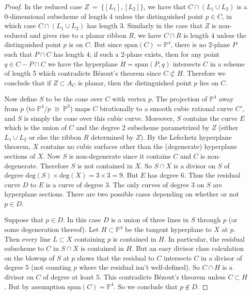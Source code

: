 \documentclass[twoside,12pt,reqno]{amsart}
\theoremstyle{plain}
\theoremstyle{definition}
\newcommand{\PP}{\mathbb{P}}
\def\ps{\vspace{4pt}}
\begin{document}
\begin{proof}
In the reduced case
$Z~=~\{[L_1],[L_2]\}$, we have that $C\cap(L_1\cup L_2)$ is a
0-dimensional subscheme of length 4 unless the distinguished point
$p\in C$, in which case $C\cap(L_1\cup L_2)$ has length 3.  Similarly
in the case that $Z$ is non-reduced and gives rise to a planar ribbon
$R$, we have $C\cap R$ is length 4 unless the distinguished point
$p$ is on $C$.  But since $\text{span}(C)=\PP^4$, there is no 2-plane $P$
such that $P\cap C$ has length 4; if such a 2-plane exists, then for
any point $q\in C-P\cap C$ we have the hyperplane $H=\text{span}(P,q)$ 
intersects $C$ in a scheme of length 5 which contradicts B\'ezout's
theorem since $C\not\subset H$.  Therefore we conclude that if
$Z\subset A_C$ is planar, then the distinguished point $p$ lies on
$C$.  

\ps

Now define $S$ to be the cone over $C$ with vertex $p$.  The
projection of $\PP^4$ away from $p$ (to $\PP^4/p~\cong~\PP^3$) maps
$C$ birationally to a smooth cubic rational curve $C'$, and $S$
is simply the cone over this cubic curve.  Moreover, $S$ contains 
the curve $E$ which is the union of $C$ and the degree 2 subscheme
parametrized by $Z$ (either $L_1\cup L_2$ or else the ribbon $R$
determined by $Z$).  By the Lefschetz hyperplane theorem, $X$ contains 
no cubic surfaces other than the (degenerate) hyperplane sections of
$X$.  Now $S$ is non-degenerate since it contains $C$ and $C$ is
non-degenerate.  Therefore $S$ is not contained in $X$.  So
$S\cap X$ is a divisor on $S$ of degree $\text{deg}(S)
\times \text{deg}(X) = 3\times 3 = 9$.  But $E$ has degree $6$.  Thus
the residual curve $D$ to $E$ is a curve of degree $3$.  The only
curves of degree $3$ on $S$ are hyperplane sections.  There are
two possible cases depending on whether or not $p\in D$.

\ps

Suppose that $p\in D$.  In this case $D$ is a union of three lines in
$S$ through $p$ (or some degeneration thereof).  Let $H\subset
\PP^4$ be the tangent hyperplane to $X$ at $p$.  Then every line
$L\subset X$ containing $p$ is contained in $H$.  In particular, the
residual subscheme to $C$ in $S\cap X$ is contained in $H$.  But
an easy divisor class calculation on the blowup of $S$ at $p$
shows that the residual to $C$ intersects $C$ in a divisor of degree
$5$ (not counting $p$ where the residual isn't well-defined).  So
$C\cap H$ is a divisor on $C$ of degree at least $5$.  This
contradicts B\'ezout's theorem unless $C\subset H$.  But by assumption 
$\text{span}(C)=\PP^4$.  So we conclude that $p\not\in D$.


\end{proof}
\end{document}
